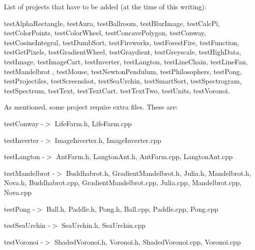 List of projects that have to be added (at the time of this writing)\-:

{\ttfamily test\-Alpha\-Rectangle}, {\ttfamily test\-Aura}, {\ttfamily test\-Ballroom}, {\ttfamily test\-Blur\-Image}, {\ttfamily test\-Calc\-Pi}, {\ttfamily test\-Color\-Points}, {\ttfamily test\-Color\-Wheel}, {\ttfamily test\-Concave\-Polygon}, {\ttfamily test\-Conway}, {\ttfamily test\-Cosine\-Integral}, {\ttfamily test\-Dumb\-Sort}, {\ttfamily test\-Fireworks}, {\ttfamily test\-Forest\-Fire}, {\ttfamily test\-Function}, {\ttfamily test\-Get\-Pixels}, {\ttfamily test\-Gradient\-Wheel}, {\ttfamily test\-Graydient}, {\ttfamily test\-Greyscale}, {\ttfamily test\-High\-Data}, {\ttfamily test\-Image}, {\ttfamily test\-Image\-Cart}, {\ttfamily test\-Inverter}, {\ttfamily test\-Langton}, {\ttfamily test\-Line\-Chain}, {\ttfamily test\-Line\-Fan}, {\ttfamily test\-Mandelbrot} , {\ttfamily test\-Mouse}, {\ttfamily test\-Newton\-Pendulum}, {\ttfamily test\-Philosophers}, {\ttfamily test\-Pong}, {\ttfamily test\-Projectiles}, {\ttfamily test\-Screenshot}, {\ttfamily test\-Sea\-Urchin}, {\ttfamily test\-Smart\-Sort}, {\ttfamily test\-Spectrogram}, {\ttfamily test\-Spectrum}, {\ttfamily test\-Text}, {\ttfamily test\-Text\-Cart}, {\ttfamily test\-Text\-Two}, {\ttfamily test\-Units}, {\ttfamily test\-Voronoi}.

As mentioned, some project require extra files. These are\-:


\begin{DoxyItemize}
\item {\ttfamily test\-Conway} -\/$>$ {\ttfamily Life\-Farm.\-h}, {\ttfamily Life\-Farm.\-cpp}
\item {\ttfamily test\-Inverter} -\/$>$ {\ttfamily Image\-Inverter.\-h}, {\ttfamily Image\-Inverter.\-cpp}
\item {\ttfamily test\-Langton} -\/$>$ {\ttfamily Ant\-Farm.\-h}, {\ttfamily Langton\-Ant.\-h}, {\ttfamily Ant\-Farm.\-cpp}, {\ttfamily Langton\-Ant.\-cpp}
\item {\ttfamily test\-Mandelbrot} -\/$>$ {\ttfamily Buddhabrot.\-h}, {\ttfamily Gradient\-Mandelbrot.\-h}, {\ttfamily Julia.\-h}, {\ttfamily Mandelbrot.\-h}, {\ttfamily Nova.\-h}, {\ttfamily Buddhabrot.\-cpp}, {\ttfamily Gradient\-Mandelbrot.\-cpp}, {\ttfamily Julia.\-cpp}, {\ttfamily Mandelbrot.\-cpp}, {\ttfamily Nova.\-cpp}
\item {\ttfamily test\-Pong} -\/$>$ {\ttfamily Ball.\-h}, {\ttfamily Paddle.\-h}, {\ttfamily Pong.\-h}, {\ttfamily Ball.\-cpp}, {\ttfamily Paddle.\-cpp}, {\ttfamily Pong.\-cpp}
\item {\ttfamily test\-Sea\-Urchin} -\/$>$ {\ttfamily Sea\-Urchin.\-h}, {\ttfamily Sea\-Urchin.\-cpp}
\item {\ttfamily test\-Voronoi} -\/$>$ {\ttfamily Shaded\-Voronoi.\-h}, {\ttfamily Voronoi.\-h}, {\ttfamily Shaded\-Voronoi.\-cpp}, {\ttfamily Voronoi.\-cpp}
\end{DoxyItemize}

